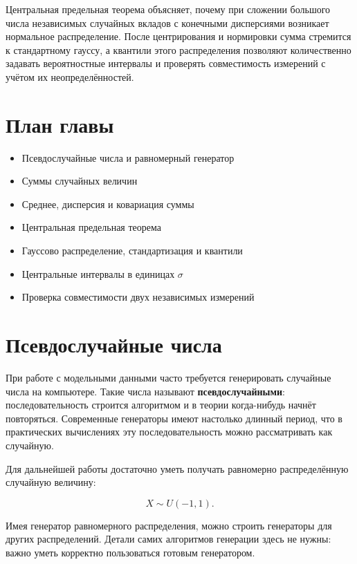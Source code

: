 \documentclass[
  russian,
  12pt,
  a4paper,
  a4paper,
  openany]{scrbook}
\providecommand{\tightlist}{%
  \setlength{\itemsep}{0pt}\setlength{\parskip}{0pt}}
\begin{document}
\begin{bookchapteropening}

Центральная предельная теорема объясняет, почему при сложении большого
числа независимых случайных вкладов с конечными дисперсиями возникает
нормальное распределение. После центрирования и нормировки сумма
стремится к стандартному гауссу, а квантили этого распределения
позволяют количественно задавать вероятностные интервалы и проверять
совместимость измерений с учётом их неопределённостей.

\end{bookchapteropening}

\section{План
главы}\label{ux43fux43bux430ux43d-ux433ux43bux430ux432ux44b-2}

\begin{itemize}
\tightlist
\item
  Псевдослучайные числа и равномерный генератор
\item
  Суммы случайных величин
\item
  Среднее, дисперсия и ковариация суммы
\item
  Центральная предельная теорема
\item
  Гауссово распределение, стандартизация и квантили
\item
  Центральные интервалы в единицах \(\sigma\)
\item
  Проверка совместимости двух независимых измерений
\end{itemize}

\section{Псевдослучайные
числа}\label{ux43fux441ux435ux432ux434ux43eux441ux43bux443ux447ux430ux439ux43dux44bux435-ux447ux438ux441ux43bux430}

При работе с модельными данными часто требуется генерировать случайные
числа на компьютере. Такие числа называют \textbf{псевдослучайными}:
последовательность строится алгоритмом и в теории когда-нибудь начнёт
повторяться. Современные генераторы имеют настолько длинный период, что
в практических вычислениях эту последовательность можно рассматривать
как случайную.

\begin{booknote}

Для дальнейшей работы достаточно уметь получать равномерно
распределённую случайную величину:

\[X\sim U(-1,1).\]

Имея генератор равномерного распределения, можно строить генераторы для
других распределений. Детали самих алгоритмов генерации здесь не нужны:
важно уметь корректно пользоваться готовым генератором.

\end{booknote}
\end{document}
